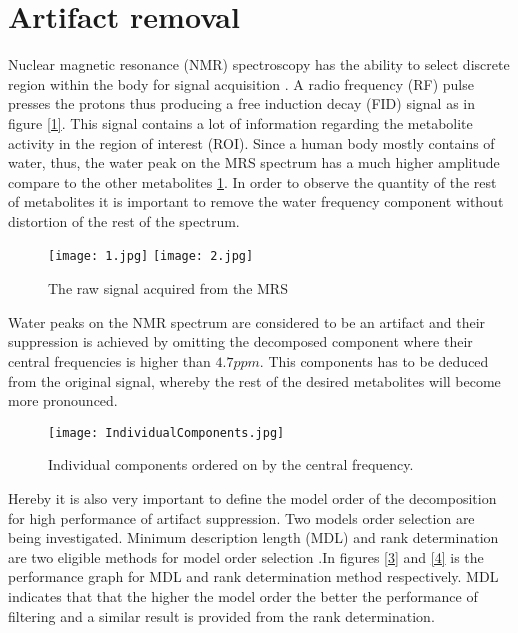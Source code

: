 \section{Artifact removal}\label{sec1}

Nuclear magnetic resonance (NMR) spectroscopy has the ability to select discrete region within the body for signal acquisition \cite{13}. A radio frequency (RF) pulse presses the protons thus producing a free induction decay (FID) signal as in figure \ref{1}. This signal contains a lot of information regarding the metabolite activity in the region of interest (ROI). Since a human body mostly contains of water, thus, the water peak on the MRS spectrum has a much higher amplitude compare to the other metabolites \ref{2}. In order to observe the quantity of the rest of metabolites it is important to remove the water frequency component without distortion of the rest of the spectrum. 

\begin{figure}[!htbp]
%
\centering
\texttt{[image: 1.jpg]}
\label{1}
\endminipage\hfill
{}%
\centering
\texttt{[image: 2.jpg]}
\label{2}
\endminipage\hfill
\caption{The raw signal acquired from the MRS }
\end{figure}

Water peaks on the NMR spectrum are considered to be an artifact and their suppression is achieved by omitting the decomposed component where their central frequencies is higher than $4.7 ppm$. This components has to be deduced from the original signal, whereby the rest of the desired metabolites will become more pronounced. 

\begin{figure}[!htbp]
\centering
\texttt{[image: IndividualComponents.jpg]}
\caption{ Individual components ordered on by the central frequency.}
\end{figure}

Hereby it is also very important to define the model order of the decomposition for high performance of artifact suppression. Two models order selection are being investigated. Minimum description length (MDL) and rank determination are two eligible methods for model order selection \cite{21}.In figures \ref{3} and \ref{4} is the performance graph for MDL and rank determination method respectively. MDL indicates that that the higher the model order the better the performance of filtering and a similar result is provided from the rank determination. 



